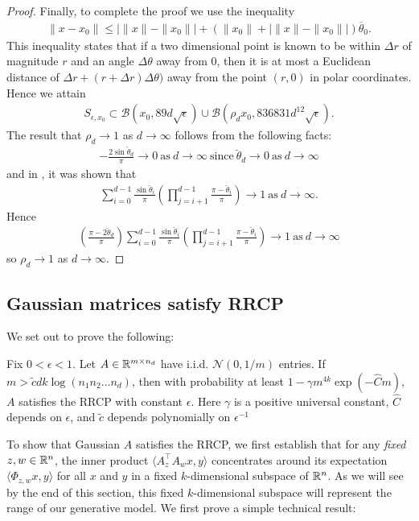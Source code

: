 \documentclass{article}
\begin{document}
\begin{proof}
Finally, to complete the proof we use the inequality \begin{align*}
\|x - x_0\| \leq |\|x\| - \|x_0\|| + \left(\|x_0\| + |\|x\| - \|x_0\||\right)\overline{\theta}_0.
\end{align*} This inequality states that if a two dimensional point is known to be within $\Delta r$ of magnitude $r$ and an angle $\Delta \theta$ away from $0$, then it is at most a Euclidean distance of $\Delta r + (r + \Delta r)\Delta \theta)$ away from the point $(r,0)$ in polar coordinates. Hence we attain \begin{align*}
S_{\epsilon,x_0} \subset \mathcal{B}(x_0,89d\sqrt{\epsilon}) \cup \mathcal{B}(\rho_d x_0, 836831d^{12}\sqrt{\epsilon}).
\end{align*} The result that $\rho_d \rightarrow 1$ as $d \rightarrow \infty$ follows from the following facts: \begin{align*}
-\frac{2\sin \breve{\theta}_d}{\pi} \rightarrow 0\ \text{as}\ d \rightarrow \infty\ \text{since}\ \breve{\theta}_d \rightarrow 0\ \text{as}\ d\rightarrow \infty
\end{align*} and in \cite{Hand2017}, it was shown that \begin{align*}
\sum_{i=0}^{d-1}\frac{\sin \breve{\theta}_i}{\pi} \left(\prod_{j=i+1}^{d-1} \frac{\pi - \breve{\theta}_i}{\pi}\right) \rightarrow 1\ \text{as}\ d \rightarrow \infty.
\end{align*} Hence \begin{align*}\left(\frac{\pi - 2 \breve{\theta}_d}{\pi}\right) \sum_{i=0}^{d-1}\frac{\sin \breve{\theta}_i}{\pi} \left(\prod_{j=i+1}^{d-1} \frac{\pi - \breve{\theta}_i}{\pi}\right) \rightarrow 1\ \text{as}\ d \rightarrow \infty
\end{align*} so $\rho_d \rightarrow 1$ as $d \rightarrow \infty$.
\end{proof}


\subsection{Gaussian matrices satisfy RRCP}

We set out to prove the following:
\begin{prop}
Fix $0 < \epsilon < 1$. Let $A \in \mathbb{R}^{m \times n_d}$ have i.i.d. $\mathcal{N}(0,1/m)$ entries. If $m > \tilde{c}dk \log (n_1n_2\dots n_d)$, then with probability at least $1 - \gamma m^{4k} \exp(-\hat{C} m)$, $A$ satisfies the RRCP with constant $\epsilon$. Here $\gamma$ is a positive universal constant, $\hat{C}$ depends on $\epsilon$, and $\tilde{c}$ depends polynomially on $\epsilon^{-1}$
\end{prop} To show that Gaussian $A$ satisfies the RRCP, we first establish that for any \textit{fixed} $z,w \in \mathbb{R}^n$, the inner product $\langle A_z^\top A_wx,y\rangle$ concentrates around its expectation $\langle \Phi_{z,w}x,y\rangle$ for all $x$ and $y$ in a fixed $k$-dimensional subspace of $\mathbb{R}^n$. As we will see by the end of this section, this fixed $k$-dimensional subspace will represent the range of our generative model. We first prove a simple technical result:
\end{document}
